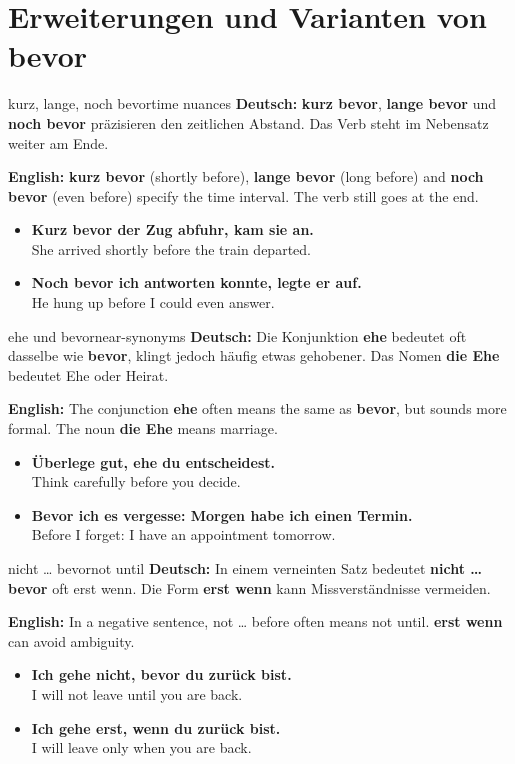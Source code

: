 \documentclass[a4paper,11pt]{article}
\newcommand{\GermanText}[1]{\textbf{Deutsch: }#1\par}
\newcommand{\EnglishText}[1]{{\small\color{SoftGray}\textbf{English: }#1\par}}
\newcommand{\ExampleItem}[2]{\item \textbf{#1}\\{\small\color{SoftGray}#2}}
\begin{document}
    \section{Erweiterungen und Varianten von \glqq bevor\grqq}
        \begin{grammarentry}{kurz, lange, noch bevor}{time nuances}
            \GermanText{\textbf{kurz bevor}, \textbf{lange bevor} und \textbf{noch bevor} präzisieren den zeitlichen Abstand. Das Verb steht im Nebensatz weiter am Ende.}
            \EnglishText{\textbf{kurz bevor} (shortly before), \textbf{lange bevor} (long before) and \textbf{noch bevor} (even before) specify the time interval. The verb still goes at the end.}
        \end{grammarentry}
        \begin{exbox}
            \begin{itemize}
                \ExampleItem{Kurz bevor der Zug abfuhr, kam sie an.}{She arrived shortly before the train departed.}
                \ExampleItem{Noch bevor ich antworten konnte, legte er auf.}{He hung up before I could even answer.}
            \end{itemize}
        \end{exbox}
        \begin{grammarentry}{ehe und bevor}{near-synonyms}
            \GermanText{Die Konjunktion \textbf{ehe} bedeutet oft dasselbe wie \textbf{bevor}, klingt jedoch häufig etwas gehobener. Das Nomen \textbf{die Ehe} bedeutet Ehe oder Heirat.}
            \EnglishText{The conjunction \textbf{ehe} often means the same as \textbf{bevor}, but sounds more formal. The noun \textbf{die Ehe} means marriage.}
        \end{grammarentry}
        \begin{exbox}
            \begin{itemize}
                \ExampleItem{Überlege gut, ehe du entscheidest.}{Think carefully before you decide.}
                \ExampleItem{Bevor ich es vergesse: Morgen habe ich einen Termin.}{Before I forget: I have an appointment tomorrow.}
            \end{itemize}
        \end{exbox}
        \begin{grammarentry}{nicht \ldots{} bevor}{not until}
            \GermanText{In einem verneinten Satz bedeutet \textbf{nicht \ldots{} bevor} oft \glqq erst wenn\grqq{}. Die Form \textbf{erst wenn} kann Missverständnisse vermeiden.}
            \EnglishText{In a negative sentence, not \ldots{} before often means not until. \textbf{erst wenn} can avoid ambiguity.}
        \end{grammarentry}
        \begin{exbox}
            \begin{itemize}
                \ExampleItem{Ich gehe nicht, bevor du zurück bist.}{I will not leave until you are back.}
                \ExampleItem{Ich gehe erst, wenn du zurück bist.}{I will leave only when you are back.}
            \end{itemize}
        \end{exbox}
\end{document}
